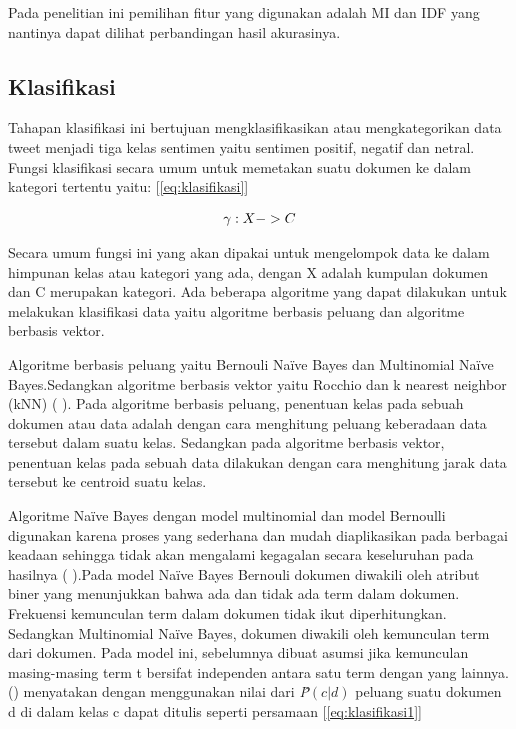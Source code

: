 Pada penelitian ini pemilihan fitur yang digunakan adalah MI dan IDF yang nantinya dapat dilihat perbandingan hasil akurasinya.

\subsection*{Klasifikasi}
Tahapan klasifikasi ini bertujuan mengklasifikasikan atau mengkategorikan data tweet menjadi tiga kelas sentimen yaitu sentimen positif, negatif dan netral.  Fungsi klasifikasi secara umum untuk memetakan suatu dokumen ke dalam kategori tertentu yaitu: [\ref{eq:klasifikasi}]

\begin{equation}
	\begin{split}
		\tiny
		\gamma : X -> C
		\label{eq:klasifikasi}
		\normalsize
	\end{split}
\end{equation}

Secara umum fungsi ini yang akan dipakai untuk mengelompok data ke dalam himpunan kelas atau kategori yang ada, dengan X adalah kumpulan dokumen dan C merupakan kategori. Ada beberapa algoritme yang dapat dilakukan untuk melakukan klasifikasi data yaitu algoritme berbasis peluang dan algoritme berbasis vektor. 

Algoritme berbasis peluang yaitu Bernouli Naïve Bayes dan Multinomial Naïve Bayes.Sedangkan algoritme berbasis vektor yaitu Rocchio dan k nearest neighbor (kNN) (\citeauthor{MANNING2008} \cite*{MANNING2008}). Pada algoritme berbasis peluang, penentuan kelas pada sebuah dokumen atau data adalah dengan cara menghitung peluang keberadaan data tersebut dalam suatu kelas. Sedangkan pada algoritme berbasis vektor, penentuan kelas pada sebuah data dilakukan dengan cara menghitung jarak data tersebut ke centroid suatu kelas.

Algoritme Naïve Bayes dengan model multinomial dan model Bernoulli digunakan karena proses yang sederhana dan mudah diaplikasikan pada berbagai keadaan sehingga tidak akan mengalami kegagalan secara keseluruhan pada hasilnya (\citeauthor{MANNING2008} \cite*{MANNING2008}).Pada model       Naïve Bayes Bernouli dokumen diwakili oleh atribut biner yang menunjukkan bahwa ada dan tidak ada term dalam dokumen. Frekuensi kemunculan term dalam dokumen tidak ikut diperhitungkan. Sedangkan Multinomial Naïve Bayes, dokumen diwakili oleh kemunculan term dari dokumen. Pada model ini, sebelumnya dibuat asumsi jika kemunculan masing-masing term t bersifat independen antara satu term dengan yang lainnya. \citeauthor{MANNING2008} (\cite*{MANNING2008}) menyatakan dengan menggunakan nilai dari \textit{\^{P}}$(c|d) $ peluang suatu dokumen d di dalam kelas c dapat ditulis seperti persamaan [\ref{eq:klasifikasi1}] 

